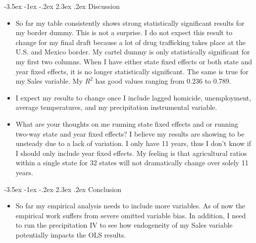 \documentclass[12pt]{article}
\makeatletter
\newcommand{\blind}{0}
\renewcommand\section{\@startsection {section}{1}{\z@}%
                                       {-3.5ex \@plus -1ex \@minus -.2ex}%
                                       {2.3ex \@plus.2ex}%
                                       {\normalfont\fontfamily{phv}\fontsize{16}{19}\bfseries}}
\makeatother
\begin{document}
\newpage

\section{Discussion} \label{s:sec5}

\begin{itemize}
    \item So far my table consistently shows strong statistically significant results for my border dummy. This is not a surprise. I do not expect this result to change for my final draft because a lot of drug trafficking takes place at the U.S. and Mexico border. My cartel dummy is only statistically significant for my first two columns. When I have either state fixed effects or both state and year fixed effects, it is no longer statistically significant. The same is true for my Sales variable. My $R^2$ has good values ranging from 0.236 to 0.789. 
    \item I expect my results to change once I include lagged homicide, unemployment, average temperatures, and my precipitation instrumental variable.
    \item What are your thoughts on me running state fixed effects and or running two-way state and year fixed effects? I believe my results are showing to be unsteady due to a lack of variation. I only have 11 years, thus I don't know if I should only include year fixed effects. My feeling is that agricultural ratios within a single state for 32 states will not dramatically change over solely 11 years.
    
\end{itemize}

\newpage

\section{Conclusion} \label{s:sec6}

\begin{itemize}
    \item So far my empirical analysis needs to include more variables. As of now the empirical work suffers from severe omitted variable bias. In addition, I need to run the precipitation IV to see how endogeneity of my Sales variable potentially impacts the OLS results.  
\end{itemize}







 
 
 




\newpage



\newpage
\cite{Security}
\cite{Secretariat97-17}
\cite{Seguridad}
\cite{Seguridad2018}
\cite{Seguridad2020}
\cite{Economia}
\cite{Wage}
\cite{CPI}
\cite{Homicide}
\end{document}
